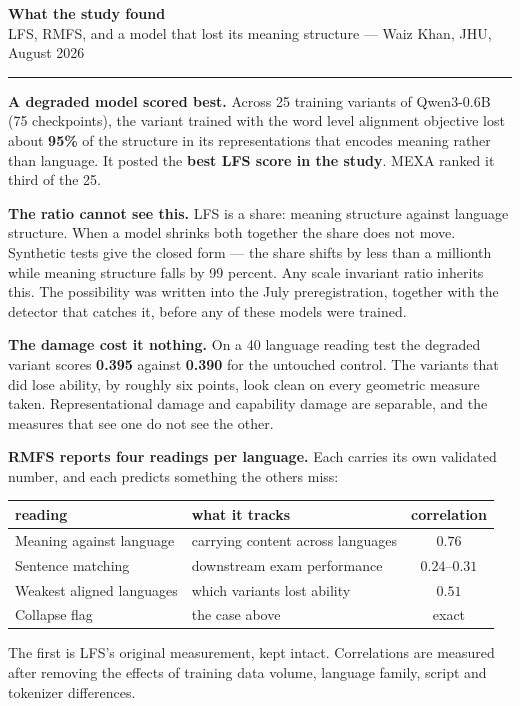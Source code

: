 \documentclass[11pt]{article}
\begin{document}
\begin{center}
{\LARGE\textbf{What the study found}}\\[3pt]
{\small LFS, RMFS, and a model that lost its meaning structure ---
Waiz Khan, JHU, August 2026}
\end{center}
\vspace{-2pt}\hrule\vspace{8pt}

\textbf{A degraded model scored best.} Across 25 training variants of
Qwen3-0.6B (75 checkpoints), the variant trained with the word level
alignment objective lost about \textbf{95\%} of the structure in its
representations that encodes meaning rather than language. It posted
the \textbf{best LFS score in the study}. MEXA ranked it third of the
25.

\textbf{The ratio cannot see this.} LFS is a share: meaning structure
against language structure. When a model shrinks both together the
share does not move. Synthetic tests give the closed form --- the share
shifts by less than a millionth while meaning structure falls by 99
percent. Any scale invariant ratio inherits this. The possibility was
written into the July preregistration, together with the detector that
catches it, before any of these models were trained.

\textbf{The damage cost it nothing.} On a 40 language reading test the
degraded variant scores \textbf{0.395} against \textbf{0.390} for the
untouched control. The variants that did lose ability, by roughly six
points, look clean on every geometric measure taken. Representational
damage and capability damage are separable, and the measures that see
one do not see the other.

\textbf{RMFS reports four readings per language.} Each carries its own
validated number, and each predicts something the others miss:
\begin{center}\small
\begin{tabular}{llc}
\toprule
reading & what it tracks & correlation\\
\midrule
Meaning against language & carrying content across languages &
$\mathbf{0.76}$\\
Sentence matching & downstream exam performance & $0.24$--$0.31$\\
Weakest aligned languages & which variants lost ability &
$\mathbf{0.51}$\\
Collapse flag & the case above & exact\\
\bottomrule
\end{tabular}
\end{center}
The first is LFS's original measurement, kept intact. Correlations are
measured after removing the effects of training data volume, language
family, script and tokenizer differences.
\end{document}
